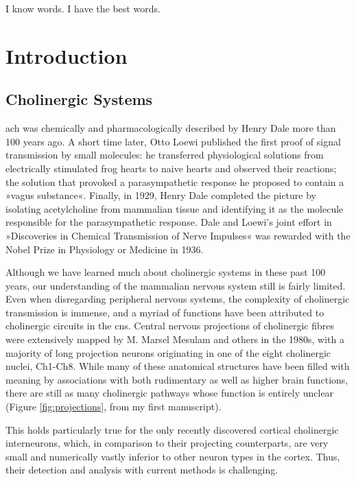 \begin{savequote}[75mm]
I know words. I have the best words.
\end{savequote}

\chapter{Introduction}
\label{introduction}
\section{Cholinergic Systems}
 \Ac{ach} was chemically and pharmacologically described by Henry Dale more than 100 years ago\cite{Dale1914}. A short time later, Otto Loewi published the first proof of signal transmission by small molecules: he transferred physiological solutions from electrically stimulated frog hearts to naive hearts and observed their reactions; the solution that provoked a parasympathetic response he proposed to contain a »vagus substance«\cite{Loewi1921}. Finally, in 1929, Henry Dale completed the picture by isolating acetylcholine from mammalian tissue and identifying it as the molecule responsible for the parasympathetic response\cite{Dale1929}. Dale and Loewi's joint effort in »Discoveries in Chemical Transmission of Nerve Impulses« was rewarded with the Nobel Prize in Physiology or Medicine in 1936.

Although we have learned much about cholinergic systems in these past 100 years, our understanding of the mammalian nervous system still is fairly limited. Even when disregarding peripheral nervous systems, the complexity of cholinergic transmission is immense, and a myriad of functions have been attributed to cholinergic circuits in the \ac{cns}. Central nervous projections of cholinergic fibres were extensively mapped by M. Marsel Mesulam and others in the 1980s\cite{Mesulam1984}, with a majority of long projection neurons originating in one of the eight cholinergic nuclei, Ch1-Ch8. While many of these anatomical structures have been filled with meaning by associations with both rudimentary as well as higher brain functions, there are still as many cholinergic pathways whose function is entirely unclear (Figure \ref{fig:projections}, from my first manuscript\cite{Lobentanzer2019a}).

This holds particularly true for the only recently discovered cortical cholinergic interneurons, which, in comparison to their projecting counterparts, are very small and numerically vastly inferior to other neuron types in the cortex. Thus, their detection and analysis with current methods is challenging. 


